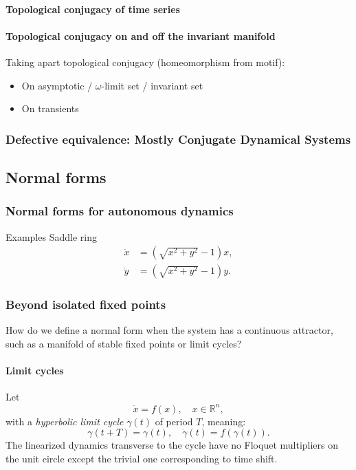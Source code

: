 \documentclass{article}
\theoremstyle{definition} \newtheorem{definition}{Definition}  \newtheorem{example}{Example}
\theoremstyle{remark} \newtheorem{remark}{Remark}
\newcounter{ct}
\begin{document}
\paragraph{Topological conjugacy of time series}
\citep{dlotko2024topconj}


\paragraph{Topological conjugacy on and off the invariant manifold}
Taking apart topological conjugacy (homeomorphism from motif):
\begin{itemize}
\item On asymptotic / $\omega$-limit set / invariant set
\item On transients \citep{koch2024biological}
\end{itemize}


\subsubsection{Defective equivalence: Mostly Conjugate Dynamical Systems}
\citep{skufca2007relaxing, skufca2008mostlyconjugate, bollt2010comparing}



\subsection{Normal forms}

\subsubsection{Normal forms for autonomous dynamics}%
Examples
Saddle ring
\begin{equation}
\begin{aligned}
\dot{x} &= (\sqrt{x^2 + y^2} - 1) x, \\
\dot{y} &= (\sqrt{x^2 + y^2} - 1) y.
\end{aligned}
\end{equation}


\subsubsection{Beyond isolated fixed points}
How do we define a normal form when the system has a continuous attractor, such as a manifold of stable fixed points or limit cycles?

\paragraph{Limit cycles}%
Let 
\[
\dot{x} = f(x), \quad x \in \mathbb{R}^n,
\]
with a \emph{hyperbolic limit cycle} \( \gamma(t) \) of period \( T \), meaning:
\[
\gamma(t + T) = \gamma(t), \quad \dot{\gamma}(t) = f(\gamma(t)).
\]
The linearized dynamics transverse to the cycle have no Floquet multipliers on the unit circle except the trivial one corresponding to time shift.
\end{document}
